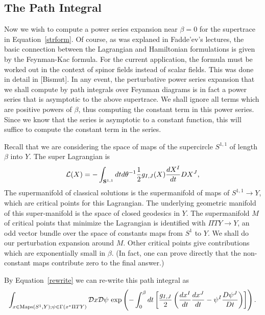 \subsection{The Path Integral}

Now we wish to compute a power series expansion near $\beta=0$ for
the supertrace in Equation~\ref{strform}.
Of course, as was explaned in Fadde'ev's lectures, the basic
connection between the Lagrangian and Hamiltonian 
formulations is given by the Feynman-Kac formula.  For the current
application, the formula must be worked out in the context of spinor
fields instead of scalar fields.  This was done in detail in [Bismut].
In any event, the perturbative power series expansion that we shall
compute by path integrals over Feynman diagrams is in fact a
power series that is asymptotic
to the above supertrace. 
We shall ignore all terms which are positive powers of $\beta$, thus
computing the constant term in this power series.  Since we know that
the series is asymptotic to a constant function, this will suffice to
compute the constant term in the series.

Recall that we are considering the space of maps of the supercircle
$S^{1,1}$ of length $\beta$ into $ Y$.
The super Lagrangian  is
$${\cal L}(X)=-\int_{{\bf S}^{1,1}}dtd\theta^{-1}
\frac{1}{2}g_{I,J}(X)\frac{dX^I}{dt}DX^J,$$ 
The supermanifold of classical solutions is the
supermanifold  of maps of
$S^{1,1}\to Y$,
which are critical points for this Lagrangian.
The underlying geometric manifold of this super-manifold is the space
of closed geodesics in $Y$. The supermanifold $M$ of critical points that
minimize the Lagrangian is identified with  $\Pi TY\to Y$, an odd
vector bundle over the space of 
constants maps from $S^1$ to $Y$.
We shall do our perturbation expansion around $M$.
Other critical points give contributions which are exponentially small
in $\beta$. 
(In fact, one can prove directly
that the non-constant maps contribute zero to the final answer.)


By Equation~\ref{rewrite} we can re-write this path integral
as
$$\int_{x\in {\rm Maps}( S^1,Y);\psi\in \Gamma(x^*\Pi TY)}{\cal D}x{\cal
D}\psi\ {\rm exp}\left(-\int_0^\beta 
dt\left[\frac{g_{I,J}}{2}\left(\frac{dx^I}{dt}\frac{dx^J}{dt}-\psi^I
\frac{D\psi^J}{Dt}\right)\right]\right).$$

